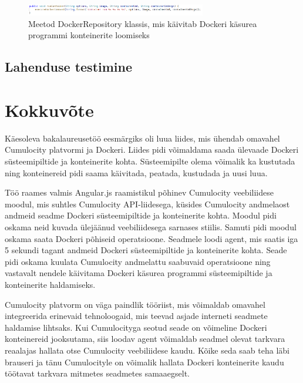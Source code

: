 \documentclass[12pt]{article}
\begin{document}
 \begin{figure} [h] %
 \begin{center}
 \includegraphics[width=0.7\textwidth]{dockerdriver_repository_runcontainer}
 \caption{Meetod DockerRepository klassis, mis käivitab Dockeri käsurea programmi konteinerite loomiseks}
 \label{fig:dockerdriver_repository_runcontainer}
 \end{center}
 \end{figure}
 
 \FloatBarrier
 



 \subsection{Lahenduse testimine}




 \clearpage
 \section{Kokkuvõte}
 Käesoleva bakalaureusetöö eesmärgiks oli luua liides, mis ühendab omavahel Cumulocity platvormi
 ja Dockeri. Liides pidi võimaldama saada ülevaade Dockeri süsteemipiltide ja konteinerite kohta.
 Süsteemipilte olema võimalik ka kustutada ning konteinereid pidi saama käivitada, peatada, kustudada
 ja uusi luua. 

 Töö raames valmis Angular.js raamistikul põhinev Cumulocity veebiliidese moodul, mis suhtles Cumulocity
 API-liidesega, küsides Cumulocity andmelaost andmeid seadme Dockeri süsteemipiltide ja konteinerite kohta.
 Moodul pidi oskama neid kuvada ülejäänud veebiliidesega sarnases stiilis. Samuti pidi moodul oskama
 saata Dockeri põhiseid operatsioone.
 Seadmele loodi agent, mis saatis iga 5 sekundi tagant andmeid Dockeri süsteemipiltide ja konteinerite kohta.
 Seade pidi oskama kuulata Cumulocity andmelattu saabuvaid operatsioone ning vastavalt nendele
 käivitama Dockeri käsurea programmi süsteemipiltide ja konteinerite haldamiseks.

 Cumulocity platvorm on väga paindlik tööriist, mis võimaldab omavahel integreerida erinevaid
 tehnoloogaid, mis teevad asjade interneti seadmete haldamise lihtsaks. Kui Cumulocityga seotud seade on võimeline
 Dockeri konteinereid jooksutama, siis loodav agent võimaldab seadmel olevat tarkvara reaalajas hallata otse
 Cumulocity veebiliidese kaudu. Kõike seda saab teha läbi brauseri ja tänu Cumulocityle on võimalik hallata
 Dockeri konteinerite kaudu töötavat tarkvara mitmetes seadmetes samaaegselt.
\end{document}
